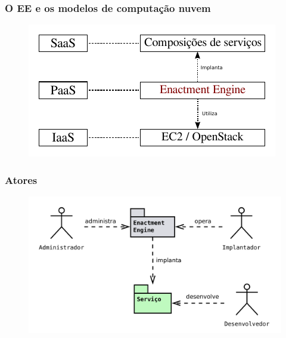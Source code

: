 \documentclass{beamer}
\begin{document}

\begin{frame}
\frametitle{O EE e os modelos de computação nuvem}

\begin{figure}
\includegraphics[width=1\linewidth]{img/nuvem_modelos}
\end{figure}

\end{frame}


\begin{frame}
\frametitle{Atores}

\begin{figure}
\includegraphics[width=0.8\linewidth]{img/atores}
\end{figure}

\end{frame}

\end{document}

